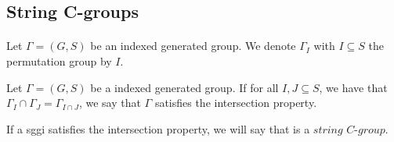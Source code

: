 \subsection{String C-groups}

\paragraph{}
Let $\Gamma = (G,S)$ be an indexed generated group. We denote $\Gamma_I$ with $I \subseteq S$ the permutation group by $I$.

\begin{definition}
  Let $\Gamma = (G,S)$ be a indexed generated group. If for all $I, J \subseteq S$, we have that $\Gamma_I \cap \Gamma_J = \Gamma_{I \cap J}$, we say that $\Gamma$ satisfies the intersection property.
\end{definition}

\begin{definition}
  If a sggi satisfies the intersection property, we will say that is a $\textit{string C-group}$.
\end{definition}



